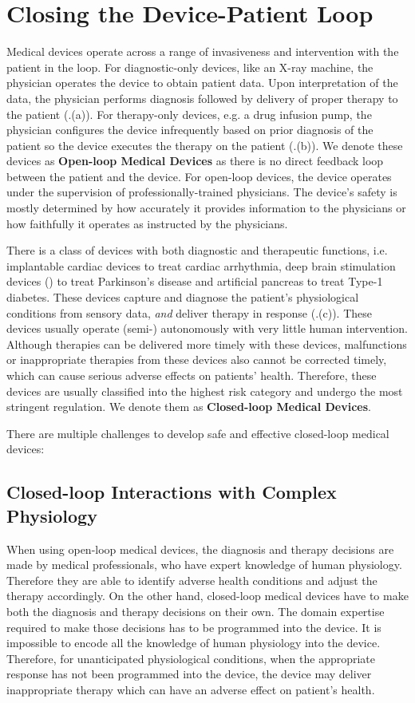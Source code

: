 \section{Closing the Device-Patient Loop}
Medical devices operate across a range of invasiveness and intervention with the patient in the loop. For diagnostic-only devices, like an X-ray machine, the physician operates the device to obtain patient data. Upon interpretation of the data, the physician performs diagnosis followed by delivery of proper therapy to the patient (.(a)). For therapy-only devices, e.g. a drug infusion pump, the physician configures the device infrequently based on prior diagnosis of the patient so the device executes the therapy on the patient (.(b)). We denote these devices as \textbf{Open-loop Medical Devices} as there is no direct feedback loop between the patient and the device. For open-loop devices, the device operates under the supervision of professionally-trained physicians. The device's safety is mostly determined by how accurately it provides information to the physicians or how faithfully it operates as instructed by the physicians.

There is a class of devices with both diagnostic and therapeutic functions, i.e. implantable cardiac devices to treat cardiac arrhythmia, deep brain stimulation devices (\cite{Brain_sti}) to treat Parkinson's disease and artificial pancreas to treat Type-1 diabetes. These devices capture and diagnose the patient's physiological conditions from sensory data, \emph{and} deliver therapy in response (.(c)). These devices usually operate (semi-) autonomously with very little human intervention. Although therapies can be delivered more timely with these devices, malfunctions or inappropriate therapies from these devices also cannot be corrected timely, which can cause serious adverse effects on patients' health. Therefore, these devices are usually classified into the highest risk category and undergo the most stringent regulation. We denote them as \textbf{Closed-loop Medical Devices}. 

There are multiple challenges to develop safe and effective closed-loop medical devices:

\subsection{Closed-loop Interactions with Complex Physiology}
When using open-loop medical devices, the diagnosis and therapy decisions are made by medical professionals, who have expert knowledge of human physiology. Therefore they are able to identify adverse health conditions and adjust the therapy accordingly. On the other hand, closed-loop medical devices have to make both the diagnosis and therapy decisions on their own. The domain expertise required to make those decisions has to be programmed into the device. It is impossible to encode all the knowledge of human physiology into the device. Therefore, for unanticipated physiological conditions, when the appropriate response has not been programmed into the device, the device may deliver inappropriate therapy which can have an adverse effect on patient's health. 

